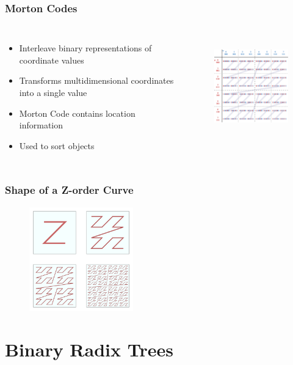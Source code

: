 \documentclass{beamer}
\begin{document}
\begin{frame}
  \frametitle{Morton Codes}
\begin{columns}[t]

\centering
\begin{itemize}
\item Interleave binary representations of coordinate values
\item Transforms multidimensional coordinates into a single value
\item Morton Code contains location information
\item Used to sort objects
\end{itemize}

\begin{figure}
\includegraphics[height=45mm]{Z-curve.pdf}
\end{figure}
\end{columns}
\end{frame}

\begin{frame}
  \frametitle{Shape of a Z-order Curve}
\begin{figure}
\includegraphics[height=45mm]{542px-Four-level_Z.png}
\end{figure}
\end{frame}

\section{Binary Radix Trees}
\end{document}

